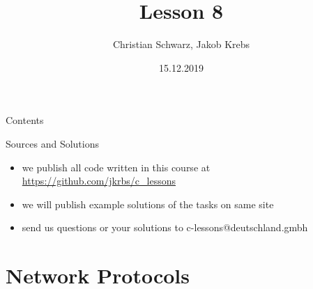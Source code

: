 \documentclass[10pt,graphics,aspectratio=169,table]{beamer}
\title{Lesson 8}
\author{Christian Schwarz, Jakob Krebs}
\date{15.12.2019}
\begin{document}
\maketitle

\begin{frame}{Contents}
    \tableofcontents
\end{frame}

\begin{frame}{Sources and Solutions}
    \begin{itemize}
        \item we publish all code written in this course at \url{https://github.com/jkrbs/c_lessons}
        \item we will publish example solutions of the tasks on same site
        \item send us questions or your solutions to c-lessons@deutschland.gmbh
    \end{itemize}
\end{frame}

\section{Network Protocols}
\subsection{}
\end{document}
